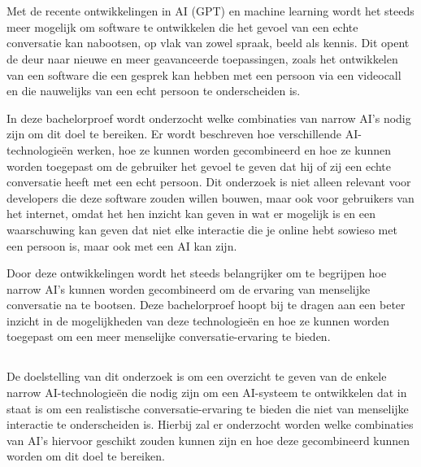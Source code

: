 
\chapter{}
\label{ch:inleiding}

Met de recente ontwikkelingen in AI (GPT) en machine learning wordt het steeds meer mogelijk om software te ontwikkelen die het gevoel van een echte conversatie kan nabootsen, op vlak van zowel spraak, beeld als kennis. Dit opent de deur naar nieuwe en meer geavanceerde toepassingen, zoals het ontwikkelen van een software die een gesprek kan hebben met een persoon via een videocall en die nauwelijks van een echt persoon te onderscheiden is.

In deze bachelorproef wordt onderzocht welke combinaties van narrow AI's nodig zijn om dit doel te bereiken. Er wordt beschreven hoe verschillende AI-technologieën werken, hoe ze kunnen worden gecombineerd en hoe ze kunnen worden toegepast om de gebruiker het gevoel te geven dat hij of zij een echte conversatie heeft met een echt persoon. Dit onderzoek is niet alleen relevant voor developers die deze software zouden willen bouwen, maar ook voor gebruikers van het internet, omdat het hen inzicht kan geven in wat er mogelijk is en een waarschuwing kan geven dat niet elke interactie die je online hebt sowieso met een persoon is, maar ook met een AI kan zijn.

Door deze ontwikkelingen wordt het steeds belangrijker om te begrijpen hoe narrow AI's kunnen worden gecombineerd om de ervaring van menselijke conversatie na te bootsen. Deze bachelorproef hoopt bij te dragen aan een beter inzicht in de mogelijkheden van deze technologieën en hoe ze kunnen worden toegepast om een meer menselijke conversatie-ervaring te bieden.

\section{}
\label{sec:onderzoeksdoelstelling}

De doelstelling van dit onderzoek is om een overzicht te geven van de enkele narrow AI-technologieën die nodig zijn om een AI-systeem te ontwikkelen dat in staat is om een realistische conversatie-ervaring te bieden die niet van menselijke interactie te onderscheiden is. Hierbij zal er onderzocht worden welke combinaties van AI's hiervoor geschikt zouden kunnen zijn en hoe deze gecombineerd kunnen worden om dit doel te bereiken.

